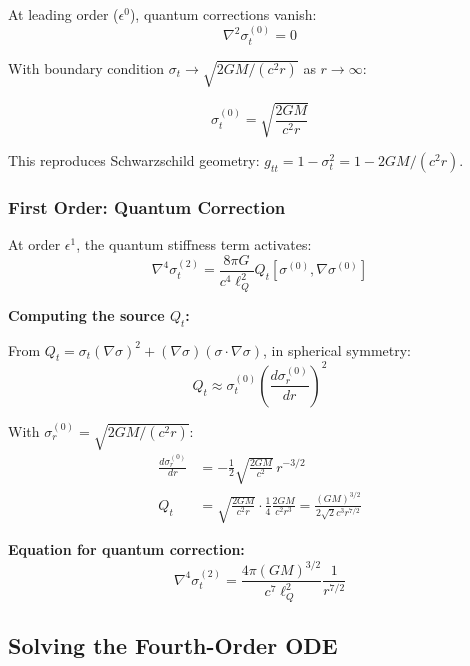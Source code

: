 \documentclass[11pt,a4paper]{article}
\theoremstyle{definition}
\theoremstyle{remark}
\begin{document}
	At leading order ($\epsilon^0$), quantum corrections vanish:
	\begin{equation}
		\nabla^2\sigma_t^{(0)} = 0
	\end{equation}
	
	With boundary condition $\sigma_t \to \sqrt{2GM/(c^2r)}$ as $r \to \infty$:
	
	\begin{equation}\label{eq:classical_sigma}
		\boxed{\sigma_t^{(0)} = \sqrt{\frac{2GM}{c^2r}}}
	\end{equation}
	
	This reproduces Schwarzschild geometry: $g_{tt} = 1 - \sigma_t^2 = 1 - 2GM/(c^2r)$.
	
	\subsubsection{First Order: Quantum Correction}
	
	At order $\epsilon^1$, the quantum stiffness term activates:
	\begin{equation}\label{eq:quantum_correction_eq}
		\nabla^4\sigma_t^{(2)} = \frac{8\pi G}{c^4\ell_Q^2}Q_t[\sigma^{(0)}, \nabla\sigma^{(0)}]
	\end{equation}
	
	\textbf{Computing the source $Q_t$:}
	
	From $Q_t = \sigma_t(\nabla\sigma)^2 + (\nabla\sigma)(\sigma \cdot \nabla\sigma)$, in spherical symmetry:
	\begin{equation}
		Q_t \approx \sigma_t^{(0)}\left(\frac{d\sigma_r^{(0)}}{dr}\right)^2
	\end{equation}
	
	With $\sigma_r^{(0)} = \sqrt{2GM/(c^2r)}$:
	\begin{align}
		\frac{d\sigma_r^{(0)}}{dr} &= -\frac{1}{2}\sqrt{\frac{2GM}{c^2}}\,r^{-3/2}\\
		Q_t &= \sqrt{\frac{2GM}{c^2r}} \cdot \frac{1}{4}\frac{2GM}{c^2r^3} = \frac{(GM)^{3/2}}{2\sqrt{2}c^3r^{7/2}}
	\end{align}
	
	\textbf{Equation for quantum correction:}
	\begin{equation}
		\nabla^4\sigma_t^{(2)} = \frac{4\pi(GM)^{3/2}}{c^7\ell_Q^2}\frac{1}{r^{7/2}}
	\end{equation}
	
	\subsection{Solving the Fourth-Order ODE}
	
\end{document}

